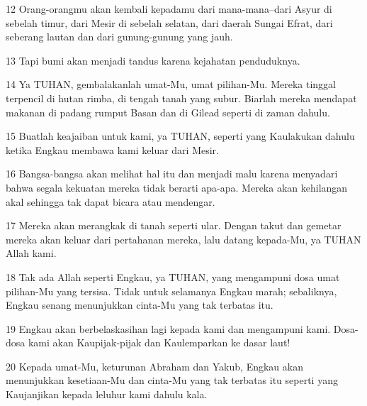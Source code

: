 \par 12 Orang-orangmu akan kembali kepadamu dari mana-mana--dari Asyur di sebelah timur, dari Mesir di sebelah selatan, dari daerah Sungai Efrat, dari seberang lautan dan dari gunung-gunung yang jauh.
\par 13 Tapi bumi akan menjadi tandus karena kejahatan penduduknya.
\par 14 Ya TUHAN, gembalakanlah umat-Mu, umat pilihan-Mu. Mereka tinggal terpencil di hutan rimba, di tengah tanah yang subur. Biarlah mereka mendapat makanan di padang rumput Basan dan di Gilead seperti di zaman dahulu.
\par 15 Buatlah keajaiban untuk kami, ya TUHAN, seperti yang Kaulakukan dahulu ketika Engkau membawa kami keluar dari Mesir.
\par 16 Bangsa-bangsa akan melihat hal itu dan menjadi malu karena menyadari bahwa segala kekuatan mereka tidak berarti apa-apa. Mereka akan kehilangan akal sehingga tak dapat bicara atau mendengar.
\par 17 Mereka akan merangkak di tanah seperti ular. Dengan takut dan gemetar mereka akan keluar dari pertahanan mereka, lalu datang kepada-Mu, ya TUHAN Allah kami.
\par 18 Tak ada Allah seperti Engkau, ya TUHAN, yang mengampuni dosa umat pilihan-Mu yang tersisa. Tidak untuk selamanya Engkau marah; sebaliknya, Engkau senang menunjukkan cinta-Mu yang tak terbatas itu.
\par 19 Engkau akan berbelaskasihan lagi kepada kami dan mengampuni kami. Dosa-dosa kami akan Kaupijak-pijak dan Kaulemparkan ke dasar laut!
\par 20 Kepada umat-Mu, keturunan Abraham dan Yakub, Engkau akan menunjukkan kesetiaan-Mu dan cinta-Mu yang tak terbatas itu seperti yang Kaujanjikan kepada leluhur kami dahulu kala.


